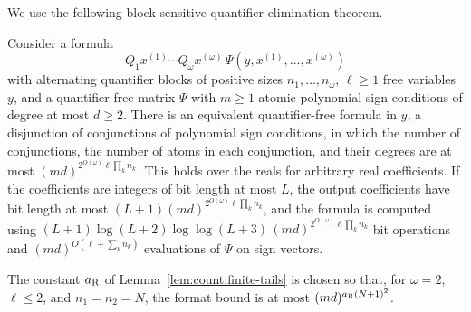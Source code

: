 We use the following block-sensitive quantifier-elimination theorem.

\begin{theorem}\label{thm:count:renegar}
Consider a formula
\[
 Q_1x^{(1)}\cdots Q_\omega x^{(\omega)}\,
 \Psi(y,x^{(1)},\dots,x^{(\omega)})
\]
with alternating quantifier blocks of positive sizes $n_1,\dots,n_\omega$,
$\ell\ge1$ free variables $y$, and a quantifier-free matrix $\Psi$ with
$m\ge1$ atomic polynomial
sign conditions of degree at most $d\ge2$. There is an equivalent
quantifier-free formula in $y$, a disjunction of conjunctions of polynomial
sign conditions, in which the number of conjunctions, the number of atoms in
each conjunction, and their degrees are at most
$(md)^{2^{O(\omega)}\ell\prod_kn_k}$. This holds over the reals for arbitrary
real coefficients. If the coefficients are integers of bit length at most
$L$, the output coefficients have bit length at most
$(L+1)(md)^{2^{O(\omega)}\ell\prod_kn_k}$, and the formula is computed using
$(L+1)\log(L+2)\log\log(L+3)\,(md)^{2^{O(\omega)}\ell\prod_kn_k}$ bit operations and
$(md)^{O(\ell+\sum_kn_k)}$ evaluations of $\Psi$ on sign vectors.
\end{theorem}

The constant $a_{\rm R}$ of Lemma~\ref{lem:count:finite-tails} is chosen so
that, for $\omega=2$, $\ell\le2$, and $n_1=n_2=N$, the format bound is at most
$(md)^{a_{\rm R}(N+1)^2}$.

